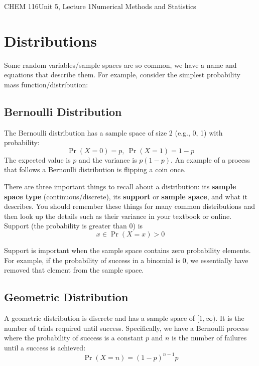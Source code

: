 \documentclass{article}
\begin{document}
\begin{tdoc}{CHEM 116}{Unit 5, Lecture 1}{Numerical Methods and Statistics}

\section{Distributions}

Some random variables/sample spaces are so common, we have a name and
equations that describe them. For example, consider the simplest
probability mass function/distribution:

\subsection{Bernoulli Distribution} 

The Bernoulli distribution has a sample space of size 2 (e.g., 0, 1) with probability:
\begin{equation}
\Pr(X = 0) = p,\: \Pr(X = 1) = 1 - p
\end{equation}
The expected value is $p$ and the variance is $p(1-p)$. An example of
a process that follows a Bernoulli distribution is flipping a coin
once.

There are three important things to recall about a distribution: its
{\bf sample space type} (continuous/discrete), its {\bf support} or
{\bf sample space}, and what it describes. You should remember these
things for many common distributions and then look up the details such
as their variance in your textbook or online. Support (the probability
is greater than $0$) is
\begin{equation}
x \in \Pr(X = x) > 0
\end{equation}

Support is important when the sample space contains zero probability
elements. For example, if the probability of success in a binomial is
0, we essentially have removed that element from the sample space.

\subsection{Geometric Distribution}
A geometric distribution is discrete and has a sample space of
$[1,\infty)$. It is the number of trials required until
  success. Specifically, we have a Bernoulli process where the
  probability of success is a constant $p$ and $n$ is the number of
  failures until a success is achieved:
\begin{equation}
\Pr(X = n) = (1 - p)^{n - 1}p
\end{equation}


\end{tdoc}
\end{document}
